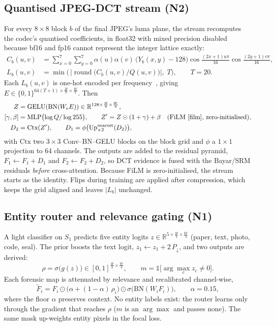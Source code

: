 \documentclass[11pt,a4paper]{article}
\newcommand{\R}{\mathbb{R}}
\begin{document}
\subsection{Quantised JPEG-DCT stream (N2)}\label{sec:qdct}
For every $8\times8$ block $b$ of the final JPEG's luma plane, the stream recomputes the
codec's quantised coefficients, in float32 with mixed precision disabled because bf16 and fp16
cannot represent the integer lattice exactly:
\begin{align}
C_b(u,v) &= \sum_{x=0}^{7}\sum_{y=0}^{7}\alpha(u)\alpha(v)\,\bigl(Y_b(x,y)-128\bigr)
           \cos\tfrac{(2x+1)u\pi}{16}\cos\tfrac{(2y+1)v\pi}{16},\\
L_b(u,v) &= \min\bigl(\,\bigl|\operatorname{round}\bigl(C_b(u,v)/Q(u,v)\bigr)\bigr|,\;T\bigr),
           \qquad T=20 .
\end{align}
Each $L_b(u,v)$ is one-hot encoded per frequency~\cite{catnet,dtd}, giving
$E\in\{0,1\}^{64(T+1)\times\frac H8\times\frac W8}$. Then
\begin{align}
Z &= \mathrm{GELU}(\mathrm{BN}(W_e E)) \in \R^{128\times\frac H8\times\frac W8},\\
[\gamma,\beta] &= \mathrm{MLP}\bigl(\log Q/\log 255\bigr),\qquad
Z' = Z\odot(1+\gamma)+\beta \quad\text{(FiLM~\cite{film}, zero-initialised)},\\
D_2 &= \mathrm{Ctx}(Z'),\qquad D_1 = \phi\bigl(\mathrm{Up}^{\mathrm{nearest}}_{\times2}(D_2)\bigr),
\end{align}
with $\mathrm{Ctx}$ two $3\times3$ Conv--BN--GELU blocks on the block grid and $\phi$ a $1\times1$
projection to 64 channels. The outputs are added to the residual pyramid,
$F_1\leftarrow F_1+D_1$ and $F_2\leftarrow F_2+D_2$, so DCT evidence is fused with the
Bayar/SRM residuals \emph{before} cross-attention. Because FiLM is zero-initialised, the stream
starts as the identity. Flips during training are applied after compression, which keeps the
grid aligned and leaves $|L_b|$ unchanged.

\subsection{Entity router and relevance gating (N1)}\label{sec:router}
A light classifier on $S_1$ predicts five entity logits
$z\in\R^{5\times\frac H4\times\frac W4}$ (paper, text, photo, code, seal). The prior boosts the
text logit, $z_1\leftarrow z_1+2\,P_{\downarrow}$, and two outputs are derived:
\begin{equation}
\rho=\sigma\bigl(g(z)\bigr)\in[0,1]^{\frac H4\times\frac W4},\qquad
m=\mathbb{1}\bigl[\arg\max_c z_c\neq 0\bigr].
\end{equation}
Each forensic map is attenuated by relevance and recalibrated channel-wise,
\begin{equation}
\tilde F_i = F_i\odot\bigl(\alpha+(1-\alpha)\,\rho_i\bigr)\odot\sigma\bigl(\mathrm{BN}(W_iF_i)\bigr),
\qquad \alpha=0.15,
\end{equation}
where the floor $\alpha$ preserves context. No entity labels exist: the router learns only
through the gradient that reaches $\rho$ ($m$ is an $\arg\max$ and passes none). The same mask
up-weights entity pixels in the focal loss.
\end{document}
